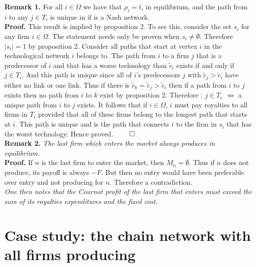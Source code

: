 \documentclass{article}
\begin{document}
\textbf{Remark 1.} For all $i\in \Omega$ we have that $\rho_i=t_i$ in equilibrium, and the path from $i$ to any $j\in T_i$ is unique in  if  is a Nash network. \\

\indent \textbf{Proof.} This result is implied by proposition 2. To see this, consider the set $s_i$ for any firm $i\in \Omega$. The statement needs only be proven when $s_i\neq \emptyset$. Therefore $|s_i|=1$ by proposition 2. Consider all paths that start at vertex $i$ in the technological network $i$ belongs to. The path from $i$ to a firm $j$ that is a predecessor of $i$ and that has a worse technology than $\tilde{c}_i$ exists if and only if $j\in T_i$. And this path is unique since all of $i$'s predecessors $j$ with $\tilde{c}_j>\tilde{c}_i$ have either no link or one link. Thus if there is $\tilde{c}_k=\tilde{c}_j>\tilde{c}_i$ then if a path from $i$ to $j$ exists then no path from $i$ to $k$ exist by proposition 2. Therefore : $j\in T_i~~\Leftrightarrow$ a unique path from $i$ to $j$ exists. It follows that if $i\in \Omega$, $i$ must pay royalties to all firms in $T_i$ provided that all of these firms belong to the longest path that starts at $i$. This path is unique and is the path that connects $i$ to the firm in $s_i$ that has the worst technology. Hence proved. $\qed$\\

\textbf{Remark 2.} \textit{The last firm which enters the market always produces in equilibrium.}\\

\indent \textbf{Proof.} If $n$ is the last firm to enter the market, then $M_n=\emptyset$. Thus if $n$ does not produce, its payoff is always $-F$. But then no entry would have been preferable over entry and not producing for $n$. Therefore a contradiction. \\
\indent \textit{One then notes that the Cournot profit of the last firm that enters must exceed the sum of its royalties expenditures and the fixed cost. }

\section{Case study: the chain network with all firms producing}
\end{document}
